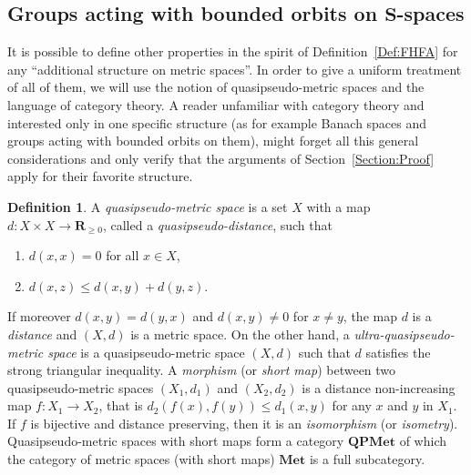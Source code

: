 \documentclass[a4paper]{article}
\theoremstyle{definition}
\newtheorem{defn}[lem]{Definition}
\newcommand*{\field}[1]{\mathbf{#1}}
\newcommand*{\R}{\field{R}}
\begin{document}
\subsection{Groups acting with bounded orbits on \texorpdfstring{$\mathbf S$}{\textbf{S}}-spaces}
It is possible to define other properties in the spirit of Definition~\ref{Def:FHFA} for any ``additional structure on metric spaces''.
In order to give a uniform treatment of all of them, we will use the notion of quasipseudo-metric spaces and the language of category theory.
A reader unfamiliar with category theory and interested only in one specific structure (as for example Banach spaces and groups acting with bounded orbits on them), might forget all this general considerations and only verify that the arguments of Section~\ref{Section:Proof} apply for their favorite structure.
%
%
\begin{defn}
A \emph{quasipseudo-metric space} is a set $X$ with a map $d\colon X\times X\to \R_{\geq0}$, called a \emph{quasipseudo-distance}, such that
\begin{enumerate}
\item $d(x,x)=0$ for all $x\in X$,
\item $d(x,z)\leq d(x,y)+d(y,z)$.
\end{enumerate}
\end{defn}
%
%
If moreover $d(x,y)=d(y,x)$ and $d(x,y)\neq 0$ for $x\neq y$, the map $d$ is a \emph{distance} and $(X,d)$ is a metric space.
On the other hand, a \emph{ultra-quasipseudo-metric space} is a quasipseudo-metric space $(X,d)$ such that $d$ satisfies the strong triangular inequality.
A \emph{morphism} (or \emph{short map}) between two quasipseudo-metric spaces $(X_1,d_1)$ and $(X_2,d_2)$ is a distance non-increasing map $f\colon X_1\to X_2$, that is $d_2(f(x),f(y))\leq d_1(x,y)$ for any $x$ and $y$ in $X_1$.
If $f$ is bijective and distance preserving, then it is an \emph{isomorphism} (or \emph{isometry}).
Quasipseudo-metric spaces with short maps form a category $\mathbf{QPMet}$ of which the category of metric spaces (with short maps) $\mathbf{Met}$ is a full subcategory.
\end{document}
